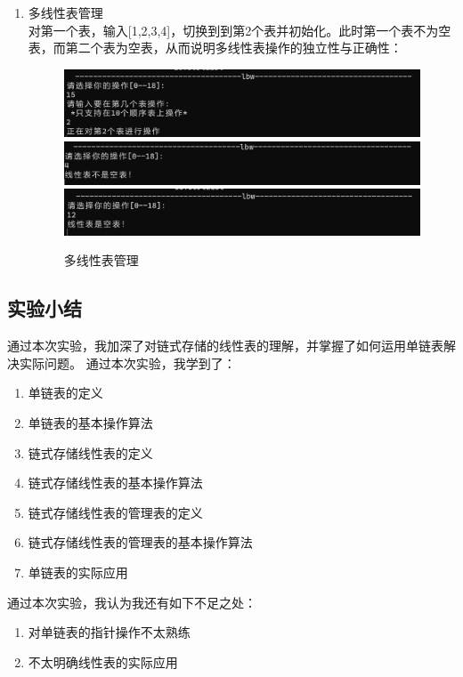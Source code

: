\documentclass[supercite]{Experimental_Report}
\theoremstyle{definition}
\begin{document}
\begin{enumerate}
	\item 多线性表管理\\
		对第一个表，输入[1,2,3,4]，切换到到第2个表并初始化。此时第一个表不为空表，而第二个表为空表，从而说明多线性表操作的独立性与正确性：
		\begin{figure}[htbp]
			\centering
			\begin{minipage}{0.7\linewidth}
				\centering
				\includegraphics[width=0.9\linewidth]{images/多表切换.png}
				\includegraphics[width=0.9\linewidth]{images/多表操作成功.png}
				\includegraphics[width=0.9\linewidth]{images/多表操作结果.png}
			\end{minipage}
			\caption{多线性表管理}
			\label{fig1-37}
		\end{figure}
	\end{enumerate}
\subsection{实验小结}
通过本次实验，我加深了对链式存储的线性表的理解，并掌握了如何运用单链表解决实际问题。
通过本次实验，我学到了：
\begin{enumerate}
	\item 单链表的定义
    \item 单链表的基本操作算法
	\item 链式存储线性表的定义
    \item 链式存储线性表的基本操作算法
    \item 链式存储线性表的管理表的定义
    \item 链式存储线性表的管理表的基本操作算法
    \item 单链表的实际应用
\end{enumerate}
通过本次实验，我认为我还有如下不足之处：
\begin{enumerate}
	\item 对单链表的指针操作不太熟练
    \item 不太明确线性表的实际应用
\end{enumerate}
\newpage
\end{document}
